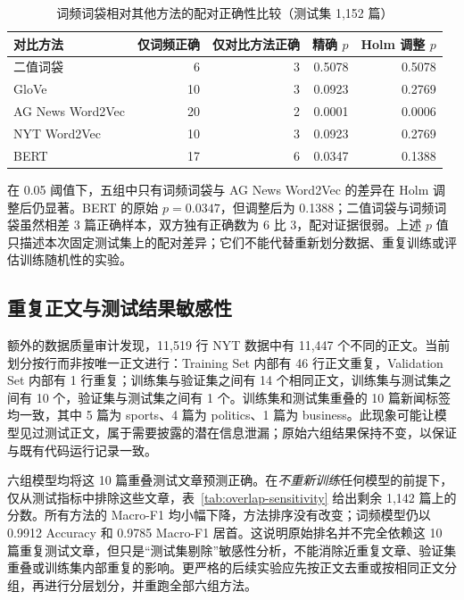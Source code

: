 \documentclass[UTF8,a4paper,10pt]{ctexart}
\begin{document}
\begin{table}[H]
  \centering
  \caption{词频词袋相对其他方法的配对正确性比较（测试集 1,152 篇）}
  \label{tab:paired}
  \begin{tabular}{lrrrr}
    \toprule
    对比方法 & 仅词频正确 & 仅对比方法正确 & 精确 $p$ & Holm 调整 $p$ \\
    \midrule
    二值词袋 & 6 & 3 & 0.5078 & 0.5078 \\
    GloVe & 10 & 3 & 0.0923 & 0.2769 \\
    AG News Word2Vec & 20 & 2 & 0.0001 & 0.0006 \\
    NYT Word2Vec & 10 & 3 & 0.0923 & 0.2769 \\
    BERT & 17 & 6 & 0.0347 & 0.1388 \\
    \bottomrule
  \end{tabular}
\end{table}

在 0.05 阈值下，五组中只有词频词袋与 AG News Word2Vec 的差异在 Holm 调整后仍显著。BERT 的原始 $p=0.0347$，但调整后为 0.1388；二值词袋与词频词袋虽然相差 3 篇正确样本，双方独有正确数为 6 比 3，配对证据很弱。上述 $p$ 值只描述本次固定测试集上的配对差异；它们不能代替重新划分数据、重复训练或评估训练随机性的实验。

\subsection{重复正文与测试结果敏感性}

额外的数据质量审计发现，11,519 行 NYT 数据中有 11,447 个不同的正文。当前划分按行而非按唯一正文进行：Training Set 内部有 46 行正文重复，Validation Set 内部有 1 行重复；训练集与验证集之间有 14 个相同正文，训练集与测试集之间有 10 个，验证集与测试集之间有 1 个。训练集和测试集重叠的 10 篇新闻标签均一致，其中 5 篇为 sports、4 篇为 politics、1 篇为 business。此现象可能让模型见过测试正文，属于需要披露的潜在信息泄漏；原始六组结果保持不变，以保证与既有代码运行记录一致。

六组模型均将这 10 篇重叠测试文章预测正确。在\emph{不重新训练}任何模型的前提下，仅从测试指标中排除这些文章，表~\ref{tab:overlap-sensitivity} 给出剩余 1,142 篇上的分数。所有方法的 Macro-F1 均小幅下降，方法排序没有改变；词频模型仍以 0.9912 Accuracy 和 0.9785 Macro-F1 居首。这说明原始排名并不完全依赖这 10 篇重复测试文章，但只是“测试集剔除”敏感性分析，不能消除近重复文章、验证集重叠或训练集内部重复的影响。更严格的后续实验应先按正文去重或按相同正文分组，再进行分层划分，并重跑全部六组方法。
\end{document}
